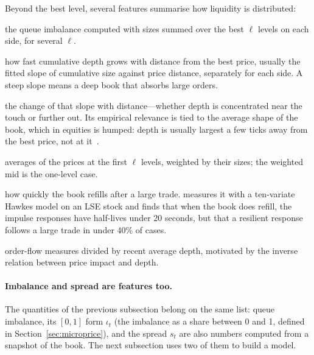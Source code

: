 Beyond the best level, several features summarise how liquidity is distributed:
\begin{description}[leftmargin=1.5em,style=nextline,itemsep=2pt]
\item[Multi-level imbalance] the queue imbalance computed with sizes summed over the best $\ell$
  levels on each side, for several $\ell$.
\item[Book slope] how fast cumulative depth grows with distance from the best price, usually the
  fitted slope of cumulative size against price distance, separately for each side. A steep slope
  means a deep book that absorbs large orders.
\item[Curvature] the change of that slope with distance---whether depth is concentrated near the
  touch or further out. Its empirical relevance is tied to the average shape of the book, which in
  equities is humped: depth is usually largest a few ticks away from the best price, not at
  it~\citep{bouchaud2002}.
\item[Depth-weighted and volume-weighted prices] averages of the prices at the first $\ell$ levels,
  weighted by their sizes; the weighted mid is the one-level case.
\item[Resilience] how quickly the book refills after a large trade. \citet{large2007} measures it with
  a ten-variate Hawkes model on an LSE stock and finds that when the book does refill, the impulse
  responses have half-lives under 20 seconds, but that a resilient response follows a large trade in
  under 40\% of cases.
\item[Depth-normalised quantities] order-flow measures divided by recent average depth, motivated by
  the inverse relation between price impact and depth.
\end{description}


\paragraph{Imbalance and spread are features too.} The quantities of the previous subsection belong
on the same list: queue imbalance, its $[0,1]$ form $\iota_t$ (the imbalance as a share between 0 and 1, defined in
Section~\ref{sec:microprice}), and the spread $s_t$ are also numbers
computed from a snapshot of the book. The next subsection uses two of them to build a model.

